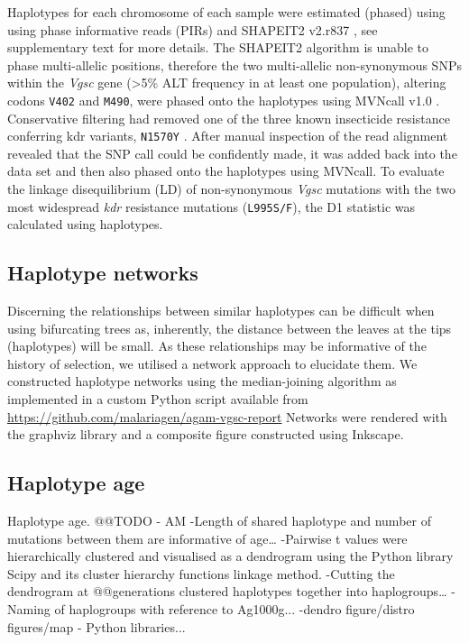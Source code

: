 \documentclass[a4paper,11pt,abstracton,hidelinks]{scrartcl}
\begin{document}
%
Haplotypes for each chromosome of each sample were estimated (phased) using using phase informative reads (PIRs) and SHAPEIT2 v2.r837 \cite{Delaneau2013}, see \cite{Ag1000gConsortium2017} supplementary text for more details.
%
The SHAPEIT2 algorithm is unable to phase multi-allelic positions, therefore the two multi-allelic non-synonymous SNPs within the \emph{Vgsc} gene (>5\% ALT frequency in at least one population), altering codons \texttt{V402} and \texttt{M490}, were phased onto the haplotypes using MVNcall v1.0 \cite{Menelaou2013}.
%
Conservative filtering had removed one of the three known insecticide resistance conferring kdr variants, \texttt{N1570Y} \cite{Jones2012}.
%
After manual inspection of the read alignment revealed that the SNP call could be confidently made, it was added back into the data set and then also phased onto the haplotypes using MVNcall.
%
To evaluate the linkage disequilibrium (LD) of non-synonymous \emph{Vgsc} mutations with the two most widespread \emph{kdr} resistance mutations (\texttt{L995S/F}), the D1 statistic was calculated using haplotypes.

\subsection*{Haplotype networks}

%
Discerning the relationships between similar haplotypes can be difficult when using bifurcating trees as, inherently, the distance between the leaves at the tips (haplotypes) will be small.
%
As these relationships may be informative of the history of selection, we utilised a network approach to elucidate them.
%
We constructed haplotype networks using the median-joining algorithm \cite{Bandelt1999} as implemented in a custom Python script available from \url{https://github.com/malariagen/agam-vgsc-report}
%
Networks were rendered with the graphviz library and a composite figure constructed using Inkscape.


\subsection*{Haplotype age}

%
Haplotype age. @@TODO - AM
-Length of shared haplotype and number of mutations between them are informative of age…
-Pairwise t values were hierarchically clustered and visualised as a dendrogram using the Python library Scipy and its cluster hierarchy functions linkage method.
-Cutting the dendrogram at @@generations clustered haplotypes together into haplogroups…
- Naming of haplogroups with reference to Ag1000g...
-dendro figure/distro figures/map - Python libraries...
\end{document}
